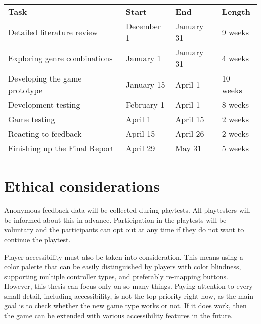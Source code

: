 \begin{center}
    \begin{tabular}{ l l l l }
        \textbf{Task}                   & \textbf{Start} & \textbf{End} & \textbf{Length} \\
        Detailed literature review      & December 1     & January  31  & 9 weeks         \\
        Exploring genre combinations    & January 1      & January 31   & 4 weeks         \\
        Developing the game prototype   & January 15     & April 1      & 10 weeks        \\
        Development testing             & February 1     & April 1      & 8 weeks         \\
        Game testing                    & April 1        & April 15     & 2 weeks         \\
        Reacting to feedback            & April 15       & April 26     & 2 weeks         \\
        Finishing up the Final Report   & April 29       & May 31       & 5 weeks         \\
    \end{tabular}
\end{center}



\section{Ethical considerations}

Anonymous feedback data will be collected during playtests. All playtesters will be informed about this in advance. Participation in the playtests will be voluntary and the participants can opt out at any time if they do not want to continue the playtest.


Player accessibility must also be taken into consideration. This means using a color palette that can be easily distinguished by players with color blindness, supporting multiple controller types, and preferably re-mapping buttons. However, this thesis can focus only on so many things. Paying attention to every small detail, including accessibility, is not the top priority right now, as the main goal is to check whether the new game type works or not. If it does work, then the game can be extended with various accessibility features in the future.
